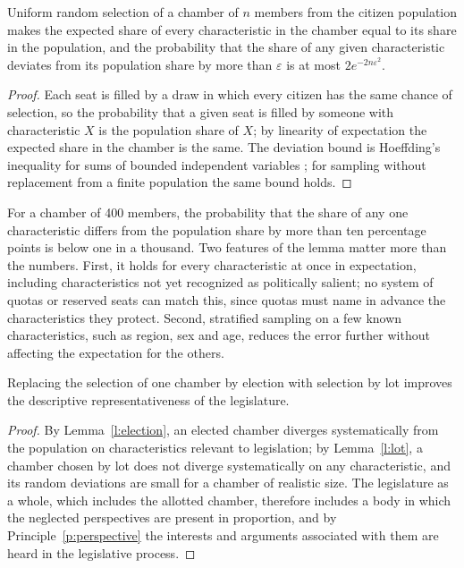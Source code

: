 \documentclass{situationist-preprint}
\begin{document}
\begin{lemma}\label{l:lot}
Uniform random selection of a chamber of $n$ members from the citizen population makes the expected share of every characteristic in the chamber equal to its share in the population, and the probability that the share of any given characteristic deviates from its population share by more than $\varepsilon$ is at most $2e^{-2n\varepsilon^2}$.
\end{lemma}

\begin{proof}
Each seat is filled by a draw in which every citizen has the same chance of selection, so the probability that a given seat is filled by someone with characteristic $X$ is the population share of $X$; by linearity of expectation the expected share in the chamber is the same. The deviation bound is Hoeffding's inequality for sums of bounded independent variables \citep{Hoeffding1963}; for sampling without replacement from a finite population the same bound holds.
\end{proof}

For a chamber of 400 members, the probability that the share of any one characteristic differs from the population share by more than ten percentage points is below one in a thousand. Two features of the lemma matter more than the numbers. First, it holds for every characteristic at once in expectation, including characteristics not yet recognized as politically salient; no system of quotas or reserved seats can match this, since quotas must name in advance the characteristics they protect. Second, stratified sampling on a few known characteristics, such as region, sex and age, reduces the error further without affecting the expectation for the others.

\begin{proposition}\label{p:improves}
Replacing the selection of one chamber by election with selection by lot improves the descriptive representativeness of the legislature.
\end{proposition}

\begin{proof}
By Lemma~\ref{l:election}, an elected chamber diverges systematically from the population on characteristics relevant to legislation; by Lemma~\ref{l:lot}, a chamber chosen by lot does not diverge systematically on any characteristic, and its random deviations are small for a chamber of realistic size. The legislature as a whole, which includes the allotted chamber, therefore includes a body in which the neglected perspectives are present in proportion, and by Principle~\ref{p:perspective} the interests and arguments associated with them are heard in the legislative process.
\end{proof}
\end{document}
